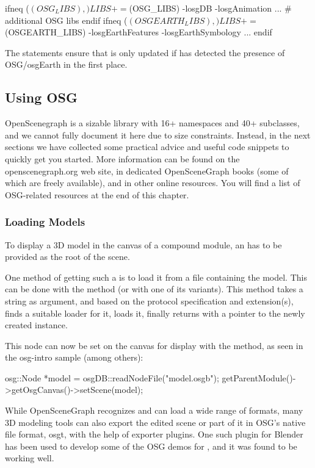 \begin{filelisting}
ifneq ($(OSG_LIBS),)
LIBS += $(OSG_LIBS) -losgDB -losgAnimation ... # additional OSG libs
endif
ifneq ($(OSGEARTH_LIBS),)
LIBS += $(OSGEARTH_LIBS) -losgEarthFeatures -losgEarthSymbology ...
endif
\end{filelisting}

The  statements ensure that  is only updated if {\opp} has detected
the presence of OSG/osgEarth in the first place.


\subsection{Using OSG}

OpenScenegraph is a sizable library with 16+ namespaces and 40+ 
subclasses, and we cannot fully document it here due to size constraints. Instead,
in the next sections we have collected some practical advice and useful code snippets
to quickly get you started. More information can be found on the openscenegraph.org
web site, in dedicated OpenSceneGraph books (some of which are freely available),
and in other online resources. You will find a list of OSG-related resources
at the end of this chapter.

\subsubsection{Loading Models}

To display a 3D model in the canvas of a compound module, an  has
to be provided as the root of the scene.

One method of getting such a  is to load it from a file containing the
model. This can be done with the  method (or with one
of its variants). This method takes a string as argument, and based on the
protocol specification and extension(s), finds a suitable loader for it,
loads it, finally returns with a pointer to the newly created 
instance.

This node can now be set on the canvas for display with the 
method, as seen in the osg-intro sample (among others):

\begin{cpp}
osg::Node *model = osgDB::readNodeFile("model.osgb");
getParentModule()->getOsgCanvas()->setScene(model);
\end{cpp}

\begin{note}
 While OpenSceneGraph recognizes and can
load a wide range of formats, many 3D modeling tools can also export the
edited scene or part of it in OSG's native file format, osgt, with the
help of exporter plugins. One such plugin for Blender has been used to
develop some of the OSG demos for {\opp}, and it was found to be working
well.
\end{note}

